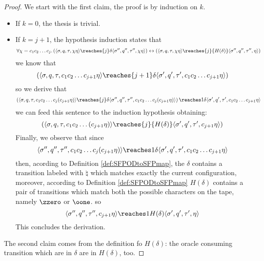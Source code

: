 \begin{proof}
  We start with the first claim, the proof is by induction on $k$.
  \begin{itemize}
    \item If $k=0$, the thesis is trivial.
    \item If $k=j+1$, the hypothesis induction states that
    $$
    \forall \chi =c_1c_2\ldots c_j.
\left(\langle \sigma, q, \tau, \chi\eta\rangle \reaches {j} \delta \langle \sigma'', q'', \tau'', \chi\eta\rangle \right)\leftrightarrow
\left(\langle \sigma, q, \tau, \chi\eta\rangle \reaches {j} {H(\delta)} \langle \sigma'', q'', \tau'', \eta\rangle\right)
    $$
    we know that
    $$
    \left(\langle \sigma, q, \tau, c_1c_2\ldots c_{j+1}\eta\rangle \reaches {j+1} \delta \langle \sigma', q', \tau', c_1c_2\ldots c_{j+1}\eta\rangle \right)
    $$
    so we derive that
    $$
    \left(\langle \sigma, q, \tau, c_1c_2\ldots c_j(c_{j+1}\eta)\rangle \reaches {j} \delta \langle \sigma'', q'', \tau'', c_1c_2\ldots c_j(c_{j+1}\eta)\rangle \right)\reaches 1\delta \langle\sigma', q', \tau', c_1c_2\ldots c_{j+1}\eta\rangle
    $$
    we can feed this sentence to the induction hypothesis obtaining:
    $$
    \left(\langle \sigma, q, \tau, c_1c_2\ldots (c_{j+1}\eta)\rangle \reaches {j} {H(\delta)} \langle \sigma', q', \tau', c_{j+1}\eta\rangle\right)
    $$
    Finally, we observe that since
    $$
    \langle \sigma'', q'', \tau'', c_1c_2\ldots c_j(c_{j+1}\eta)\rangle \reaches 1\delta\langle \sigma', q', \tau', c_1c_2\ldots c_{j+1}\eta\rangle
    $$
    then, acording to Definition \ref{def:SFPODtoSFPmap}, the $\delta$
    contains a transition labeled with $\natural$  which matches exactly the
    current configuration, moreover, according to Definition \ref{def:SFPODtoSFPmap}
    $H(\delta)$ contains a pair of transitions which match both the possible
    characters on the tape, namely $\zzero$ or $\oone$.
    so
    $$
    \langle \sigma'', q'', \tau'', c_{j+1}\eta\rangle \reaches 1{H(\delta)}\langle \sigma', q', \tau',\eta\rangle
    $$
    This concludes the derivation.
  \end{itemize}
  The second claim comes from the definition fo $H(\delta)$: the oracle consuming
  transition which are in $\delta$ are in $H(\delta)$, too.
\end{proof}

